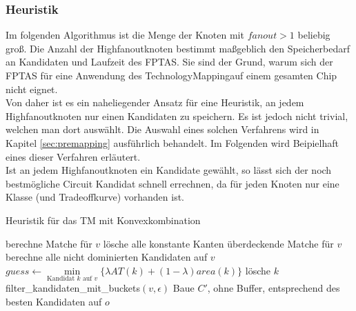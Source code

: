 \documentclass[11pt, a4paper, german]{article}
\newcommand{\TM}{TechnologyMapping}
\begin{document}
\subsubsection{Heuristik}
\label{subsubsec:heuristik}
Im folgenden Algorithmus ist die Menge der Knoten mit $fanout > 1$ beliebig groß.
Die Anzahl der Highfanoutknoten bestimmt maßgeblich den Speicherbedarf an Kandidaten und Laufzeit des FPTAS. Sie sind der Grund, warum sich der FPTAS für eine Anwendung des \TM auf einem gesamten Chip nicht eignet. \\
Von daher ist es ein naheliegender Ansatz für eine Heuristik, an jedem Highfanoutknoten nur einen Kandidaten zu speichern. Es ist jedoch nicht trivial, welchen man dort auswählt. Die Auswahl eines solchen Verfahrens wird in Kapitel \ref{sec:premapping} ausführlich behandelt. Im Folgenden wird Beipielhaft eines dieser Verfahren erläutert. \\
Ist an jedem Highfanoutknoten ein Kandidate gewählt, so lässt sich der noch bestmögliche Circuit Kandidat schnell errechnen, da für jeden Knoten nur eine Klasse (und Tradeoffkurve) vorhanden ist.\\
\begin{algorithm}[H]
 \LinesNumbered
 \DontPrintSemicolon
 \caption{Heuristik f\"ur das TM mit Konvexkombination}
 {
  berechne Matche für $v$\;
  lösche alle konstante Kanten überdeckende Matche für $v$\;
  berechne alle nicht dominierten Kandidaten auf $v$\;
  {
    $guess \gets \min\limits_{\text{Kandidat }k\text{ auf }v}\{ \lambda AT(k) + (1-\lambda) area(k)  \}$\;
    {
      {
	l\"osche $k$\;
      }
    }
  }
  filter\_kandidaten\_mit\_buckets$(v,\epsilon)$\;
 }
 Baue $C'$, ohne Buffer, entsprechend des besten Kandidaten auf $o$ \; 
\end{algorithm}\ \\
\end{document}
